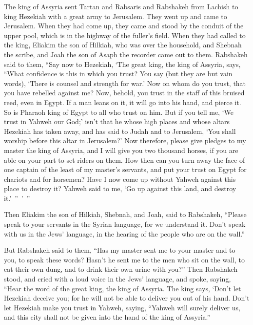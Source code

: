 {\par }{\PP {}The king of Assyria sent Tartan and Rabsaris and Rabshakeh from Lachish to king Hezekiah with a great army to Jerusalem. They went up and came to Jerusalem. When they had come up, they came and stood by the conduit of the upper pool, which is in the highway of the fuller’s field.
When they had called to the king, Eliakim the son of Hilkiah, who was over the household, and Shebnah the scribe, and Joah the son of Asaph the recorder came out to them.
Rabshakeh said to them, “Say now to Hezekiah, ‘The great king, the king of Assyria, says, “What confidence is this in which you trust?
You say (but they are but vain words), ‘There is counsel and strength for war.’ Now on whom do you trust, that you have rebelled against me?
Now, behold, you trust in the staff of this bruised reed, even in Egypt. If a man leans on it, it will go into his hand, and pierce it. So is Pharaoh king of Egypt to all who trust on him.
But if you tell me, ‘We trust in Yahweh our God;’ isn’t that he whose high places and whose altars Hezekiah has taken away, and has said to Judah and to Jerusalem, ‘You shall worship before this altar in Jerusalem?’
Now therefore, please give pledges to my master the king of Assyria, and I will give you two thousand horses, if you are able on your part to set riders on them.
How then can you turn away the face of one captain of the least of my master’s servants, and put your trust on Egypt for chariots and for horsemen?
Have I now come up without Yahweh against this place to destroy it? Yahweh said to me, ‘Go up against this land, and destroy it.’ ” ’ ”
\par }{\PP {}Then Eliakim the son of Hilkiah, Shebnah, and Joah, said to Rabshakeh, “Please speak to your servants in the Syrian language, for we understand it. Don’t speak with us in the Jews’ language, in the hearing of the people who are on the wall.”
\par }{\PP {}But Rabshakeh said to them, “Has my master sent me to your master and to you, to speak these words? Hasn’t he sent me to the men who sit on the wall, to eat their own dung, and to drink their own urine with you?”
Then Rabshakeh stood, and cried with a loud voice in the Jews’ language, and spoke, saying, “Hear the word of the great king, the king of Assyria.
The king says, ‘Don’t let Hezekiah deceive you; for he will not be able to deliver you out of his hand.
Don’t let Hezekiah make you trust in Yahweh, saying, “Yahweh will surely deliver us, and this city shall not be given into the hand of the king of Assyria.”
}
